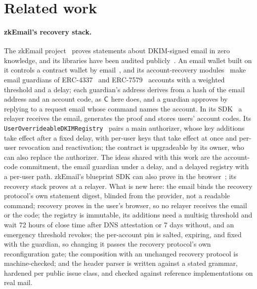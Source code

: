 \section{Related work}\label{sec:related}

\paragraph{zkEmail's recovery stack.} The zkEmail
project~\cite{zkemail-docs,zkemail-verify,zkemail-nr} proves statements about
DKIM-signed email in zero knowledge, and its libraries have been audited
publicly~\cite{audit-zksecurity-2024,audit-yacademy,audit-zellic-2024,audit-matterlabs-2024,audit-veridise-2024,audit-consensys-2024}.
An email wallet built on it controls a contract wallet by
email~\cite{suegami-email-wallet}, and its account-recovery
modules~\cite{zkemail-recovery} make email guardians of ERC-4337~\cite{erc4337}
and ERC-7579~\cite{erc7579} accounts with a weighted threshold and a delay;
each guardian's address derives from a hash of the email address and an
account code, as $\mathsf{C}$ here does, and a guardian approves by replying to a
request email whose command names the account. In its SDK~\cite{zkemail-tx-builder}
a relayer receives the email, generates the proof and stores users' account
codes. Its \texttt{UserOverrideableDKIMRegistry}~\cite{zkemail-user-overrideable-registry}
pairs a main authorizer, whose key additions take effect after a fixed
delay, with per-user keys that take effect at once and per-user revocation and
reactivation; the contract is upgradeable by its owner, who can also replace
the authorizer. The ideas shared with this work are the account-code
commitment, the email guardian under a delay, and a delayed registry with a
per-user path. zkEmail's blueprint SDK can also prove in the
browser~\cite{zkemail-sdk-js}; its recovery stack proves at a relayer. What
is new here:
the email binds the recovery protocol's own statement digest, blinded from
the provider, not a readable command; recovery proves in the user's browser,
so no relayer receives the email or the code; the registry is immutable, its additions need a multisig threshold and
wait 72 hours of close time after DNS attestation or 7 days without, and an
emergency threshold revokes; the per-account pin is salted, expiring, and
fixed with the guardian, so changing it passes the recovery protocol's own
reconfiguration gate; the composition with an unchanged recovery protocol is
machine-checked; and the header parser is written against a stated grammar,
hardened per public issue class, and checked against reference
implementations on real mail.


